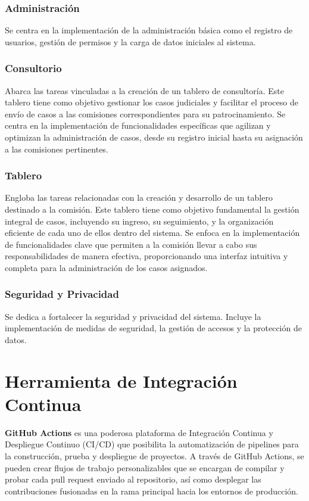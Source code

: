 \subsubsection{Administración}
Se centra en la implementación de la administración básica como el registro de usuarios, gestión de permisos y la carga de datos iniciales al sistema.

\subsubsection{Consultorio}
Abarca las tareas vinculadas a la creación de un tablero de consultoría. Este tablero tiene como objetivo gestionar los casos judiciales y facilitar el proceso de envío de casos a las comisiones correspondientes para su patrocinamiento. Se centra en la implementación de funcionalidades específicas que agilizan y optimizan la administración de casos, desde su registro inicial hasta su asignación a las comisiones pertinentes.

\subsubsection{Tablero}
Engloba las tareas relacionadas con la creación y desarrollo de un tablero destinado a la comisión. Este tablero tiene como objetivo fundamental la gestión integral de casos, incluyendo su ingreso, su seguimiento, y la organización eficiente de cada uno de ellos dentro del sistema. Se enfoca en la implementación de funcionalidades clave que permiten a la comisión llevar a cabo sus responsabilidades de manera efectiva, proporcionando una interfaz intuitiva y completa para la administración de los casos asignados.


\subsubsection{Seguridad y Privacidad}
Se dedica a fortalecer la seguridad y privacidad del sistema. Incluye la implementación de medidas de seguridad, la gestión de accesos y la protección de datos.



\section{Herramienta de Integración Continua}

\textbf{GitHub Actions} es una poderosa plataforma de Integración Continua y Despliegue Continuo (CI/CD) que posibilita la automatización de pipelines para la construcción, prueba y despliegue de proyectos. A través de GitHub Actions, se pueden crear flujos de trabajo personalizables que se encargan de compilar y probar cada pull request enviado al repositorio, así como desplegar las contribuciones fusionadas en la rama principal hacia los entornos de producción.

